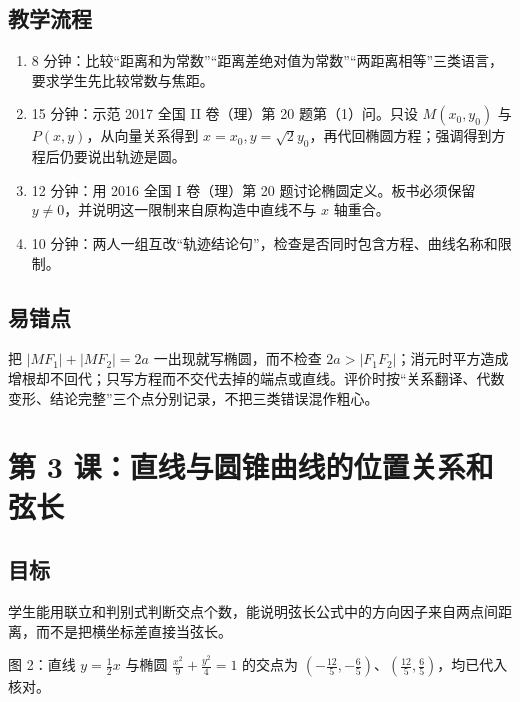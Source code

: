 \documentclass[UTF8,a4paper,11pt]{ctexart}
\newcommand{\lesson}[1]{\section{#1}}
\begin{document}
\subsection*{教学流程}
\begin{enumerate}
  \item 8 分钟：比较“距离和为常数”“距离差绝对值为常数”“两距离相等”三类语言，要求学生先比较常数与焦距。
  \item 15 分钟：示范 2017 全国 II 卷（理）第 20 题第（1）问。只设 $M(x_0,y_0)$ 与 $P(x,y)$，从向量关系得到 $x=x_0,y=\sqrt2y_0$，再代回椭圆方程；强调得到方程后仍要说出轨迹是圆。
  \item 12 分钟：用 2016 全国 I 卷（理）第 20 题讨论椭圆定义。板书必须保留 $y\ne0$，并说明这一限制来自原构造中直线不与 $x$ 轴重合。
  \item 10 分钟：两人一组互改“轨迹结论句”，检查是否同时包含方程、曲线名称和限制。
\end{enumerate}

\subsection*{易错点}
把 $|MF_1|+|MF_2|=2a$ 一出现就写椭圆，而不检查 $2a>|F_1F_2|$；消元时平方造成增根却不回代；只写方程而不交代去掉的端点或直线。评价时按“关系翻译、代数变形、结论完整”三个点分别记录，不把三类错误混作粗心。

\lesson{第 3 课：直线与圆锥曲线的位置关系和弦长}
\subsection*{目标}
学生能用联立和判别式判断交点个数，能说明弦长公式中的方向因子来自两点间距离，而不是把横坐标差直接当弦长。

\begin{center}
\end{center}
\noindent\small 图 2：直线 $y=\frac12x$ 与椭圆 $\frac{x^2}{9}+\frac{y^2}{4}=1$ 的交点为 $(-\frac{12}{5},-\frac65)$、$(\frac{12}{5},\frac65)$，均已代入核对。\normalsize
\end{document}

